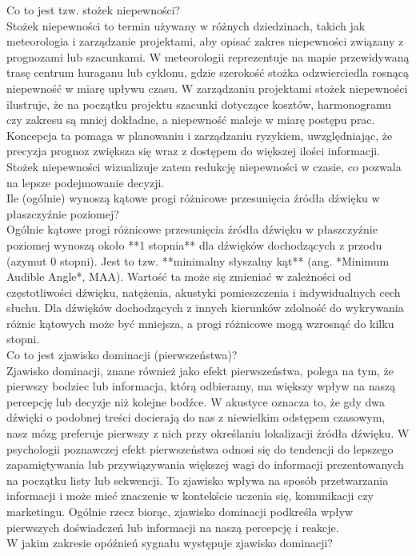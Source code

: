\documentclass{article}
\begin{document}
Co to jest tzw. stożek niepewności? \\
Stożek niepewności to termin używany w różnych dziedzinach, takich jak meteorologia i zarządzanie projektami, aby opisać zakres niepewności związany z prognozami lub szacunkami. W meteorologii reprezentuje na mapie przewidywaną trasę centrum huraganu lub cyklonu, gdzie szerokość stożka odzwierciedla rosnącą niepewność w miarę upływu czasu. W zarządzaniu projektami stożek niepewności ilustruje, że na początku projektu szacunki dotyczące kosztów, harmonogramu czy zakresu są mniej dokładne, a niepewność maleje w miarę postępu prac. Koncepcja ta pomaga w planowaniu i zarządzaniu ryzykiem, uwzględniając, że precyzja prognoz zwiększa się wraz z dostępem do większej ilości informacji. Stożek niepewności wizualizuje zatem redukcję niepewności w czasie, co pozwala na lepsze podejmowanie decyzji. \\
Ile (ogólnie) wynoszą kątowe progi różnicowe przesunięcia źródła dźwięku w płaszczyźnie poziomej? \\
Ogólnie kątowe progi różnicowe przesunięcia źródła dźwięku w płaszczyźnie poziomej wynoszą około **1 stopnia** dla dźwięków dochodzących z przodu (azymut 0 stopni). Jest to tzw. **minimalny słyszalny kąt** (ang. *Minimum Audible Angle*, MAA). Wartość ta może się zmieniać w zależności od częstotliwości dźwięku, natężenia, akustyki pomieszczenia i indywidualnych cech słuchu. Dla dźwięków dochodzących z innych kierunków zdolność do wykrywania różnic kątowych może być mniejsza, a progi różnicowe mogą wzrosnąć do kilku stopni. \\
Co to jest zjawisko dominacji (pierwszeństwa)? \\
Zjawisko dominacji, znane również jako efekt pierwszeństwa, polega na tym, że pierwszy bodziec lub informacja, którą odbieramy, ma większy wpływ na naszą percepcję lub decyzje niż kolejne bodźce. W akustyce oznacza to, że gdy dwa dźwięki o podobnej treści docierają do nas z niewielkim odstępem czasowym, nasz mózg preferuje pierwszy z nich przy określaniu lokalizacji źródła dźwięku. W psychologii poznawczej efekt pierwszeństwa odnosi się do tendencji do lepszego zapamiętywania lub przywiązywania większej wagi do informacji prezentowanych na początku listy lub sekwencji. To zjawisko wpływa na sposób przetwarzania informacji i może mieć znaczenie w kontekście uczenia się, komunikacji czy marketingu. Ogólnie rzecz biorąc, zjawisko dominacji podkreśla wpływ pierwszych doświadczeń lub informacji na naszą percepcję i reakcje. \\
W jakim zakresie opóźnień sygnału występuje zjawisko dominacji? \\
\end{document}
